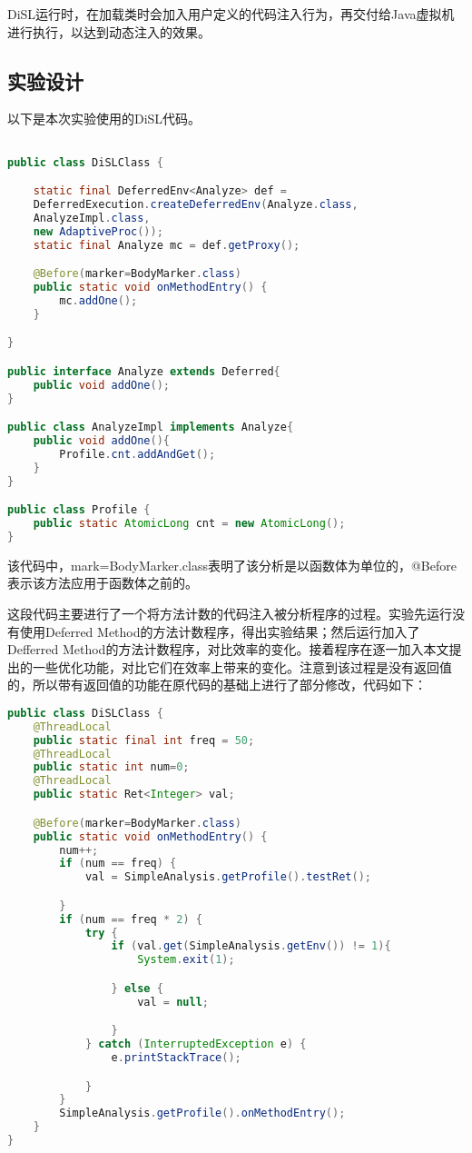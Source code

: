 DiSL运行时，在加载类时会加入用户定义的代码注入行为，再交付给Java虚拟机进行执行，以达到动态注入的效果。

\subsection{实验设计}

以下是本次实验使用的DiSL代码。

\begin{lstlisting}[language=Java]

public class DiSLClass {

	static final DeferredEnv<Analyze> def = 
	DeferredExecution.createDeferredEnv(Analyze.class, 
	AnalyzeImpl.class, 
	new AdaptiveProc());
	static final Analyze mc = def.getProxy();

	@Before(marker=BodyMarker.class)
	public static void onMethodEntry() {
		mc.addOne();
	}

}

public interface Analyze extends Deferred{
	public void addOne();
}

public class AnalyzeImpl implements Analyze{
	public void addOne(){
		Profile.cnt.addAndGet();
	}
}

public class Profile {
	public static AtomicLong cnt = new AtomicLong();
}
\end{lstlisting}

该代码中，mark=BodyMarker.class表明了该分析是以函数体为单位的，@Before表示该方法应用于函数体之前的。

这段代码主要进行了一个将方法计数的代码注入被分析程序的过程。实验先运行没有使用Deferred Method的方法计数程序，得出实验结果；然后运行加入了Defferred Method的方法计数程序，对比效率的变化。接着程序在逐一加入本文提出的一些优化功能，对比它们在效率上带来的变化。注意到该过程是没有返回值的，所以带有返回值的功能在原代码的基础上进行了部分修改，代码如下：

\begin{lstlisting}[language=Java]
public class DiSLClass {
	@ThreadLocal
	public static final int freq = 50;
	@ThreadLocal
	public static int num=0;
	@ThreadLocal
	public static Ret<Integer> val;

	@Before(marker=BodyMarker.class)
	public static void onMethodEntry() {
		num++;
		if (num == freq) {
			val = SimpleAnalysis.getProfile().testRet();

		}
		if (num == freq * 2) {
			try {
				if (val.get(SimpleAnalysis.getEnv()) != 1){
					System.exit(1);

				} else {
					val = null;

				}
			} catch (InterruptedException e) {
				e.printStackTrace();

			}
		}
		SimpleAnalysis.getProfile().onMethodEntry();
	}
}
\end{lstlisting}

